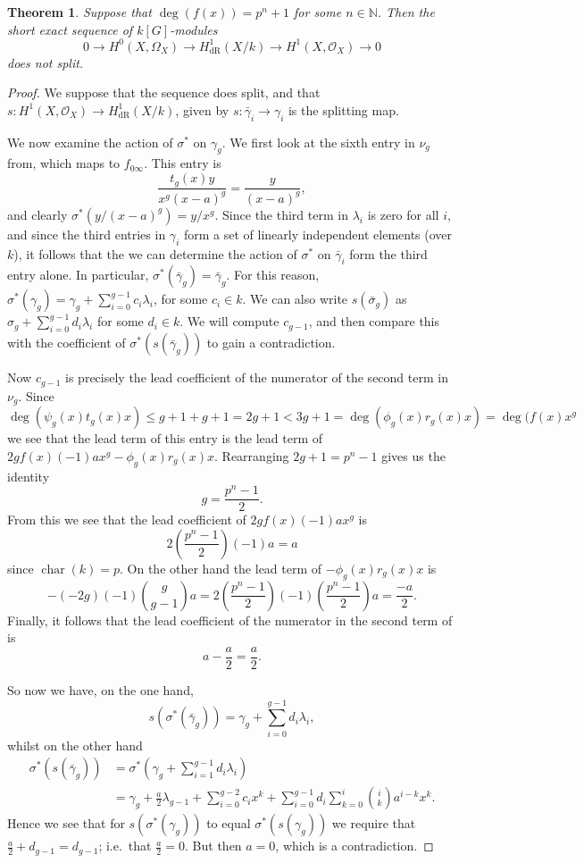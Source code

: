 \documentclass[draft, 11pt]{article} %
\theoremstyle{plain}
\newtheorem{thm}[defn]{Theorem}
\theoremstyle{remark}
\newcommand{\ra}{\rightarrow}
\newcommand{\NN}{{\mathbb N}}
\newcommand{\hzero}{{H^0(X,\Omega_X)}}
\newcommand{\hone}{H^1(X,\mathcal{O}_X)}
\newcommand{\derhamhone}{H_{\text {dR}}^1(X/k)}
\newcommand{\ie}{i.e.\ }
\DeclareMathOperator{\cha}{char}
\begin{document}
\begin{thm}
Suppose that $\deg(f(x)) = p^n + 1$ for some $n \in \NN$.
Then the short exact sequence of $k[G]$-modules
\[
0 \ra \hzero \ra \derhamhone \ra \hone \ra 0
\]
does not split.
\end{thm}
\begin{proof}
We suppose that the sequence does split, and that $s \colon \hone \ra \derhamhone$, given by $s \colon \bar\gamma_i \to \gamma_i$ is the splitting map.

We now examine the action of $\sigma^*$ on $\gamma_g$.
We first look at the sixth entry in $\nu_g$ from, which maps to $f_{0\infty}$.
This entry is
\[
\frac{t_g(x)y}{x^g(x-a)^g} = \frac{y}{(x-a)^g},
\]
and clearly $\sigma^*(y/(x-a)^g) = y/x^g$.
Since the third term in $\lambda_i$ is zero for all $i$, and since the third entries in $\gamma_i$ form a set of linearly independent elements (over $k$), it follows that the we can determine the action of $\sigma^*$ on $\bar\gamma_i$ form the third entry alone.
In particular, $\sigma^*(\bar\gamma_g) = \bar\gamma_g$.
For this reason, $\sigma^*(\gamma_g) = \gamma_g + \sum_{i=0}^{g-1} c_i\lambda_i$, for some $c_i \in k$.
We can also write $s(\bar\sigma_g)$ as $\sigma_g + \sum_{i =0}^{g-1}d_i\lambda_i$ for some $d_i \in k$.
We will compute $c_{g-1}$, and then compare this with the coefficient of $\sigma^*(s(\bar\gamma_g))$ to gain a contradiction.


Now $c_{g-1}$ is precisely the lead coefficient of the numerator of the second term in $\nu_g$.
Since
\[
\deg(\psi_g(x)t_g(x)x) \leq g+1 + g+ 1 = 2g+1 < 3g+1 = \deg(\phi_g(x)r_g(x)x) = \deg(f(x)x^g
\]
we see that the lead term of this entry is the lead term of $2gf(x)(-1)ax^g - \phi_g(x)r_g(x)x$.
Rearranging $2g+1 = p^n - 1$ gives us the identity
\[
g = \frac{p^n - 1}{2}.
\]
From this we see that the lead coefficient of $2gf(x)(-1)ax^g$ is 
\[
2\left( \frac{p^n-1}{2} \right) (-1)a = a
\]
since $\cha(k) = p$.
On the other hand the lead term of $-\phi_g(x)r_g(x)x$ is
\[
-(-2g)(-1)\binom{g}{g-1}a = 2\left(\frac{p^n -1 }{2}\right) (-1)\left( \frac{p^n - 1}{2} \right)a = \frac{-a}{2}.
\]
Finally, it follows that the lead coefficient of the numerator in the second term of is
\[
a - \frac{a}{2} = \frac{a}{2}.
\]

So now we have, on the one hand,
\[
s(\sigma^*(\bar\gamma_g)) = \gamma_g + \sum_{i=0}^{g-1}d_i\lambda_i,
\]
whilst on the other hand
\begin{align}
\sigma^*(s(\bar\gamma_g)) & = \sigma^*(\gamma_g + \sum_{i=1}^{g-1} d_i\lambda_i ) \\
& = \gamma_g + \frac{a}{2}\lambda_{g-1} + \sum_{i=0}^{g-2} c_i x^k + \sum_{i=0}^{g-1} d_i \sum_{k=0}^{i} \binom{i}{k}a^{i-k}x^k.
\end{align}
Hence we see that for $s(\sigma^*(\gamma_g))$ to equal $\sigma^*(s(\gamma_g))$ we require that $\frac{a}{2} + d_{g-1} = d_{g-1}$; \ie that $\frac{a}{2} = 0$. 
But then $a=0$, which is a contradiction.

\end{proof}
\end{document}
